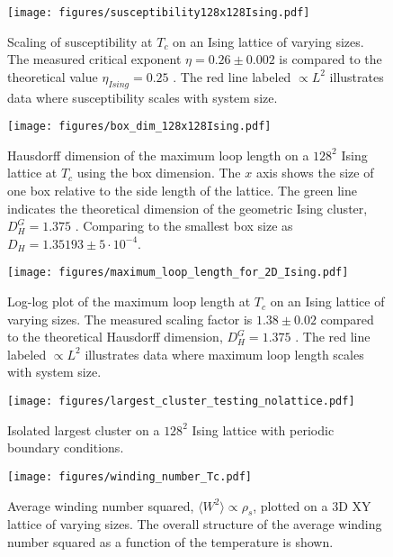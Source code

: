 
\begin{figure}[h!]
    \centering
        \texttt{[image: figures/susceptibility128x128Ising.pdf]}
    \caption{Scaling of susceptibility at $T_c$ on an Ising lattice of varying sizes. The measured critical exponent $\eta = 0.26 \pm 0.002$ is compared to the theoretical value $\eta_{Ising} = 0.25$ \cite{Plischke:EqStatMech}. The red line labeled $\propto L^2$ illustrates data where susceptibility scales with system size.}
    \label{fig:results_isingsusc}
\end{figure}

\begin{figure}[h!]
    \centering
        \texttt{[image: figures/box\_dim\_128x128Ising.pdf]}
    \caption{Hausdorff dimension of the maximum loop length on a $128^2$ Ising lattice at $T_c$ using the box dimension. The $x$ axis shows the size of one box relative to the side length of the lattice. The green line indicates the theoretical dimension of the geometric Ising cluster, $D_H^G = 1.375$ \cite{Duplantier:GeoHausdorff}. Comparing to the smallest box size as $D_H = 1.35193 \pm 5 \cdot 10^{-4}$.}
    \label{fig:results_boxdimension}
\end{figure}

\begin{figure}[h!]
    \centering
        \texttt{[image: figures/maximum\_loop\_length\_for\_2D\_Ising.pdf]}
    \caption{Log-log plot of the maximum loop length at $T_c$ on an Ising lattice of varying sizes. The measured scaling factor is $1.38 \pm 0.02$ compared to the theoretical Hausdorff dimension, $D_H^G = 1.375$ \cite{Duplantier:GeoHausdorff}. The red line labeled $\propto L^2$ illustrates data where maximum loop length scales with system size.}
    \label{fig:results_maxloopdimension}
\end{figure}


\begin{figure}[h!]
    \centering
        \texttt{[image: figures/largest\_cluster\_testing\_nolattice.pdf]}
    \caption{Isolated largest cluster on a $128^2$ Ising lattice with periodic boundary conditions.}
    \label{fig:largest_cluster_illu}
\end{figure}

\begin{figure}[h!]
    \centering
        \texttt{[image: figures/winding\_number\_Tc.pdf]}
    \caption{Average winding number squared, $\langle W^2 \rangle \propto \rho_s$, plotted on a 3D XY lattice of varying sizes. The overall structure of the average winding number squared as a function of the temperature is shown.}
    \label{fig:results_windingnumberTc}
\end{figure}


